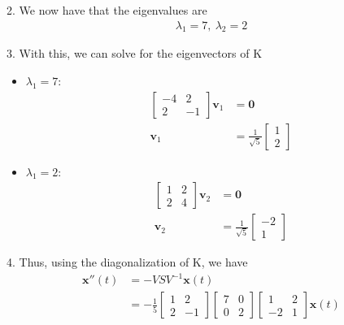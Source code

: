 \documentclass[12pt]{article}
\begin{document}
2. We now have that the eigenvalues are
\begin{align*}
    \lambda_{1} = 7 , ~ \lambda_{2} = 2
\end{align*}

3. With this, we can solve for the eigenvectors of K
\begin{itemize}
    \item $\lambda_{1} = 7$:
          \begin{align*}
              \begin{bmatrix} -4 & 2 \\ 2 & -1 \end{bmatrix}\mathbf{v}_1 & = \mathbf{0}                                              \\
              \mathbf{v}_1                                               & = \frac{1}{\sqrt{5}}\begin{bmatrix} 1 \\  2 \end{bmatrix}
          \end{align*}
    \item $\lambda_{1} = 2$:
          \begin{align*}
              \begin{bmatrix} 1 & 2 \\ 2 & 4 \end{bmatrix}\mathbf{v}_2 & = \mathbf{0}                                               \\
              \mathbf{v}_2                                             & = \frac{1}{\sqrt{5}}\begin{bmatrix} -2 \\  1 \end{bmatrix}
          \end{align*}
\end{itemize}

4. Thus, using the diagonalization of K, we have
\begin{align*}
    \mathbf{x}''(t) & = -VSV^{-1} \mathbf{x}(t)                                                                                                                                                \\
                    & = -\frac{1}{5} \begin{bmatrix} 1 & 2 \\ 2 & - 1 \end{bmatrix}  \begin{bmatrix} 7 & 0 \\ 0 & 2 \end{bmatrix}  \begin{bmatrix} 1 & 2 \\ -2 & 1 \end{bmatrix} \mathbf{x}(t)
\end{align*}
\end{document}
